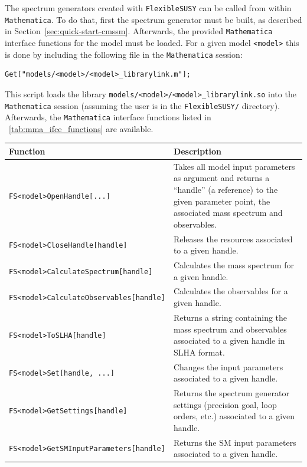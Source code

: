 \documentclass[final,3p,11pt,pdflatex]{elsarticle}
\makeatletter
\newcommand{\fs}{\texttt{FlexibleSUSY}\@\xspace}
\newcommand{\mathematica}{\texttt{Ma\-the\-ma\-ti\-ca}\xspace}
\newcommand{\code}[1]{\lstinline|#1|}  %
\newcommand{\secref}[1]{Section~\ref{#1}}
\newcommand{\tabref}[1]{\tablename~\ref{#1}}
\makeatother
\begin{document}
The spectrum generators created with \fs can be called from within
\mathematica.  To do that, first the spectrum generator must be built,
as described in \secref{sec:quick-start-cmssm}.  Afterwards, the
provided \mathematica interface functions for the model must be
loaded.  For a given model \code{<model>} this is done by including
the following file in the \mathematica session:
%
\begin{lstlisting}
Get["models/<model>/<model>_librarylink.m"];
\end{lstlisting}
%
This script loads the library
\code{models/<model>/<model>_librarylink.so} into the \mathematica
session (assuming the user is in the \code{FlexibleSUSY/} directory).
Afterwards, the \mathematica interface functions listed in
\tabref{tab:mma_ifce_functions} are available.
%
\begin{table}[tbh]
  \centering
  \begin{tabularx}{\textwidth}{lX}
    \toprule
    Function & Description \\

    \midrule \code{FS<model>OpenHandle[...]} & Takes all model input
    parameters as argument and returns a ``handle'' (a reference) to
    the given parameter point, the associated mass spectrum and observables.\\

    \code{FS<model>CloseHandle[handle]} & Releases the resources
    associated to a given handle.\\

    \code{FS<model>CalculateSpectrum[handle]} & Calculates the mass
    spectrum for a given handle.\\

    \code{FS<model>CalculateObservables[handle]} & Calculates the
    observables for a given handle.\\

    \code{FS<model>ToSLHA[handle]} & Returns a string containing the
    mass spectrum and observables associated to a given handle in SLHA format.\\

    \code{FS<model>Set[handle, ...]} & Changes the input parameters
    associated to a given handle.\\

    \code{FS<model>GetSettings[handle]} & Returns the spectrum generator
    settings (precision goal, loop orders, etc.) associated to
    a given handle.\\

    \code{FS<model>GetSMInputParameters[handle]} & Returns the SM
    input parameters associated to a given handle.\\


\end{tabularx}
\end{table}
\end{document}
